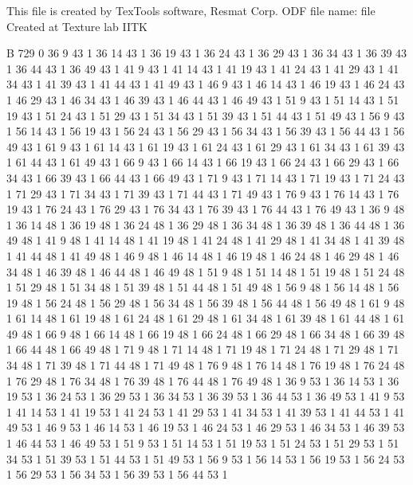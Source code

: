 This file is created by TexTools software, Resmat Corp.
ODF file name: file Created at Texture lab IITK

B 729 0			
	36	9	43	1
	36	14	43	1
	36	19	43	1
	36	24	43	1
	36	29	43	1
	36	34	43	1
	36	39	43	1
	36	44	43	1
	36	49	43	1
	41	9	43	1
	41	14	43	1
	41	19	43	1
	41	24	43	1
	41	29	43	1
	41	34	43	1
	41	39	43	1
	41	44	43	1
	41	49	43	1
	46	9	43	1
	46	14	43	1
	46	19	43	1
	46	24	43	1
	46	29	43	1
	46	34	43	1
	46	39	43	1
	46	44	43	1
	46	49	43	1
	51	9	43	1
	51	14	43	1
	51	19	43	1
	51	24	43	1
	51	29	43	1
	51	34	43	1
	51	39	43	1
	51	44	43	1
	51	49	43	1
	56	9	43	1
	56	14	43	1
	56	19	43	1
	56	24	43	1
	56	29	43	1
	56	34	43	1
	56	39	43	1
	56	44	43	1
	56	49	43	1
	61	9	43	1
	61	14	43	1
	61	19	43	1
	61	24	43	1
	61	29	43	1
	61	34	43	1
	61	39	43	1
	61	44	43	1
	61	49	43	1
	66	9	43	1
	66	14	43	1
	66	19	43	1
	66	24	43	1
	66	29	43	1
	66	34	43	1
	66	39	43	1
	66	44	43	1
	66	49	43	1
	71	9	43	1
	71	14	43	1
	71	19	43	1
	71	24	43	1
	71	29	43	1
	71	34	43	1
	71	39	43	1
	71	44	43	1
	71	49	43	1
	76	9	43	1
	76	14	43	1
	76	19	43	1
	76	24	43	1
	76	29	43	1
	76	34	43	1
	76	39	43	1
	76	44	43	1
	76	49	43	1
	36	9	48	1
	36	14	48	1
	36	19	48	1
	36	24	48	1
	36	29	48	1
	36	34	48	1
	36	39	48	1
	36	44	48	1
	36	49	48	1
	41	9	48	1
	41	14	48	1
	41	19	48	1
	41	24	48	1
	41	29	48	1
	41	34	48	1
	41	39	48	1
	41	44	48	1
	41	49	48	1
	46	9	48	1
	46	14	48	1
	46	19	48	1
	46	24	48	1
	46	29	48	1
	46	34	48	1
	46	39	48	1
	46	44	48	1
	46	49	48	1
	51	9	48	1
	51	14	48	1
	51	19	48	1
	51	24	48	1
	51	29	48	1
	51	34	48	1
	51	39	48	1
	51	44	48	1
	51	49	48	1
	56	9	48	1
	56	14	48	1
	56	19	48	1
	56	24	48	1
	56	29	48	1
	56	34	48	1
	56	39	48	1
	56	44	48	1
	56	49	48	1
	61	9	48	1
	61	14	48	1
	61	19	48	1
	61	24	48	1
	61	29	48	1
	61	34	48	1
	61	39	48	1
	61	44	48	1
	61	49	48	1
	66	9	48	1
	66	14	48	1
	66	19	48	1
	66	24	48	1
	66	29	48	1
	66	34	48	1
	66	39	48	1
	66	44	48	1
	66	49	48	1
	71	9	48	1
	71	14	48	1
	71	19	48	1
	71	24	48	1
	71	29	48	1
	71	34	48	1
	71	39	48	1
	71	44	48	1
	71	49	48	1
	76	9	48	1
	76	14	48	1
	76	19	48	1
	76	24	48	1
	76	29	48	1
	76	34	48	1
	76	39	48	1
	76	44	48	1
	76	49	48	1
	36	9	53	1
	36	14	53	1
	36	19	53	1
	36	24	53	1
	36	29	53	1
	36	34	53	1
	36	39	53	1
	36	44	53	1
	36	49	53	1
	41	9	53	1
	41	14	53	1
	41	19	53	1
	41	24	53	1
	41	29	53	1
	41	34	53	1
	41	39	53	1
	41	44	53	1
	41	49	53	1
	46	9	53	1
	46	14	53	1
	46	19	53	1
	46	24	53	1
	46	29	53	1
	46	34	53	1
	46	39	53	1
	46	44	53	1
	46	49	53	1
	51	9	53	1
	51	14	53	1
	51	19	53	1
	51	24	53	1
	51	29	53	1
	51	34	53	1
	51	39	53	1
	51	44	53	1
	51	49	53	1
	56	9	53	1
	56	14	53	1
	56	19	53	1
	56	24	53	1
	56	29	53	1
	56	34	53	1
	56	39	53	1
	56	44	53	1

